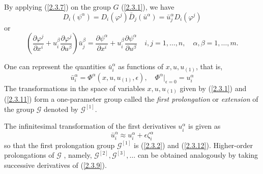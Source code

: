 By applying (\ref{2.3.7}) on the group $G$ (\ref{2.3.1}), we have 
\begin{equation} D_i( \psi^{\alpha}) = D_i( \varphi^j)\bar{D}_j ( \bar{u}^{\alpha} ) = \bar{u}^{\alpha}_j D_i( \varphi^j)
\label{2.3.9}
\end{equation}  or \begin{equation} \left( 
\frac{\partial \varphi^j}{\partial x^i}+ u_i^{\beta} \frac{\partial \varphi^j}{\partial u^{\beta}} \right) \bar{u}_j^{\beta} = \frac{\partial \psi^{\alpha}}{\partial x^i} + u_i^{\beta}  \frac{\partial \psi^{\alpha}}{\partial u^{\beta}} \quad i,j = 1,\ldots,n, \quad \alpha,\beta =1,\ldots,m. \label{2.10.1}
\end{equation}

One  can represent the quantities $ \bar{u}_i^{\alpha}$ as functions of $ x, u, u_{(1)}$, that is, 
\begin{equation} \bar{u}_i^{\alpha} = \Phi^{\alpha}(x,u, u_{(1)}, \epsilon), \quad \Phi^{\alpha}|_{\epsilon =0} = u^{\alpha}_i \label{2.3.11}
\end{equation}
The transformations in the space of variables $ x,u, u_{(1)} $ given by (\ref{2.3.1}) and (\ref{2.3.11}) form a one-parameter group called the \textit{first prolongation} or \textit{extension} of the group $\mathcal{G}$ denoted by $\mathcal{G}^{[1]}$.

The infinitesimal transformation of the first derivatives $ u_i^{\alpha}$ is given as \begin{equation}
\bar{u}_i^{\alpha} \approx  u_i^{\alpha} + \epsilon \zeta_i^{\alpha}  \label{2.3.12}
\end{equation} so that the first prolongation group $ \mathcal{G}^{[1]}$ is (\ref{2.3.2}) and (\ref{2.3.12}). Higher-order prolongations of $\mathcal{G}$ , namely, $\mathcal{G}^{[2]}, \mathcal{G}^{[3]},
\ldots$ can be obtained  analogously by taking successive derivatives of (\ref{2.3.9}).

